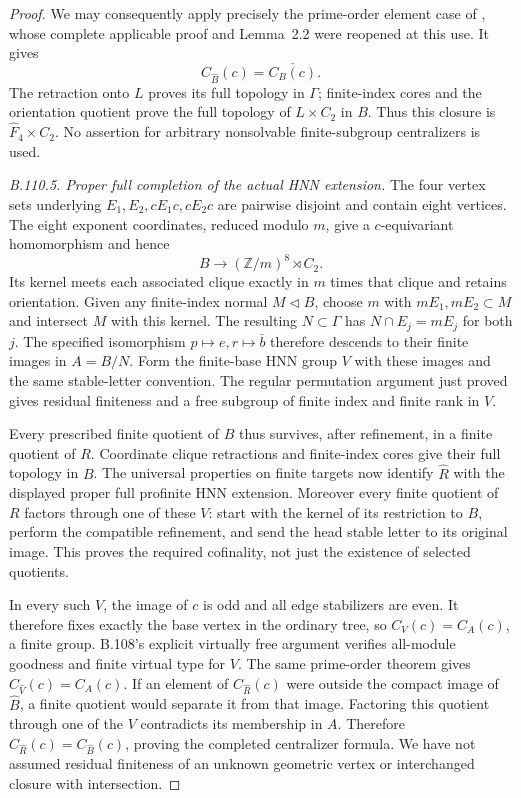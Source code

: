 \begin{proof}
We may consequently apply precisely the prime-order element case
of \citet[Theorem~4.3]{BoggiZalesskii2025}, whose complete applicable
proof and Lemma~2.2 were reopened at this use. It gives
\[
 C_{\widehat B}(c)=\overline{C_B(c)}.
\]
The retraction onto $L$ proves its full topology in $\Gamma$;
finite-index cores and the orientation quotient prove the full
topology of $L\times C_2$ in $B$. Thus this closure is
$\widehat F_4\times C_2$. No assertion for arbitrary nonsolvable
finite-subgroup centralizers is used.

\emph{B.110.5. Proper full completion of the actual HNN extension.}
The four vertex sets underlying $E_1,E_2,cE_1c,cE_2c$ are pairwise
disjoint and contain eight vertices. The eight exponent coordinates,
reduced modulo $m$, give a $c$-equivariant homomorphism and hence
\[
 B\longrightarrow(\mathbb Z/m)^8\rtimes C_2.
\]
Its kernel meets each associated clique exactly in $m$ times that
clique and retains orientation. Given any finite-index normal
$M\lhd B$, choose $m$ with $mE_1,mE_2\subset M$ and intersect
$M$ with this kernel. The resulting $N\subset\Gamma$ has
$N\cap E_j=mE_j$ for both $j$. The specified isomorphism
$p\mapsto e,r\mapsto\bar b$ therefore descends to their finite
images in $A=B/N$. Form the finite-base HNN group $V$ with these
images and the same stable-letter convention. The regular permutation
argument just proved gives residual finiteness and a free subgroup
of finite index and finite rank in $V$.

Every prescribed finite quotient of $B$ thus survives, after
refinement, in a finite quotient of $R$. Coordinate clique retractions
and finite-index cores give their full topology in $B$. The universal
properties on finite targets now identify $\widehat R$ with the
displayed proper full profinite HNN extension. Moreover every finite
quotient of $R$ factors through one of these $V$: start with the
kernel of its restriction to $B$, perform the compatible refinement,
and send the head stable letter to its original image. This proves
the required cofinality, not just the existence of selected quotients.

In every such $V$, the image of $c$ is odd and all edge stabilizers
are even. It therefore fixes exactly the base vertex in the ordinary
tree, so $C_V(c)=C_A(c)$, a finite group. B.108's explicit virtually
free argument verifies all-module goodness and finite virtual type
for $V$. The same prime-order theorem gives
$C_{\widehat V}(c)=C_A(c)$. If an element of $C_{\widehat R}(c)$
were outside the compact image of $\widehat B$, a finite quotient
would separate it from that image. Factoring this quotient through
one of the $V$ contradicts its membership in $A$. Therefore
$C_{\widehat R}(c)=C_{\widehat B}(c)$, proving the completed
centralizer formula. We have not assumed residual finiteness of
an unknown geometric vertex or interchanged closure with intersection.


\end{proof}
